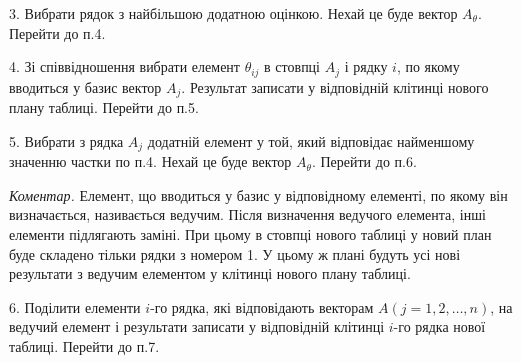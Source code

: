 3. Вибрати рядок з найбільшою додатною оцінкою. Нехай це буде вектор $A_\theta$. Перейти до п.4.

4. Зі співвідношення вибрати елемент $\theta_{ij}$ в стовпці $A_j$ і рядку $i$, по якому вводиться у базис вектор $A_j$. Результат записати у відповідній клітинці нового плану таблиці. Перейти до п.5.

5. Вибрати з рядка $A_j$ додатній елемент у той, який відповідає найменшому значенню частки по п.4. Нехай це буде вектор $A_\theta$. Перейти до п.6.

\textit{Коментар.} Елемент, що вводиться у базис у відповідному елементі, по якому він визначається, називається ведучим. Після визначення ведучого елемента, інші елементи підлягають заміні. При цьому в стовпці нового таблиці у новий план буде складено тільки рядки з номером 1. У цьому ж плані будуть усі нові результати з ведучим елементом у клітинці нового плану таблиці.

6. Поділити елементи $i$-го рядка, які відповідають векторам $A(j=1,2,\ldots,n)$, на ведучий елемент і результати записати у відповідній клітинці $i$-го рядка нової таблиці. Перейти до п.7.

